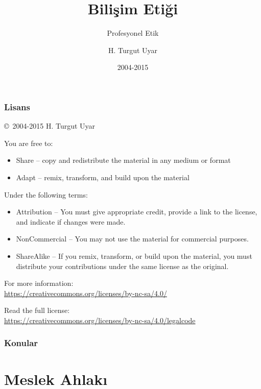 \documentclass[dvipsnames]{beamer}
\title{Bilişim Etiği}
\subtitle{Profesyonel Etik}
\author{H. Turgut Uyar}
\date{2004-2015}
\theoremstyle{plain}
\begin{document}
\begin{frame}
  \titlepage
\end{frame}

\begin{frame}
  \frametitle{Lisans}

  \hfill
  \copyright~2004-2015 H. Turgut Uyar

  \vfill
  \begin{footnotesize}
    You are free to:
    \begin{itemize}
      \itemsep0em
      \item Share -- copy and redistribute the material in any medium or format
      \item Adapt -- remix, transform, and build upon the material
    \end{itemize}

    Under the following terms:
    \begin{itemize}
      \itemsep0em
      \item Attribution -- You must give appropriate credit, provide a link to
        the license, and indicate if changes were made.

      \item NonCommercial -- You may not use the material for commercial
        purposes.

      \item ShareAlike -- If you remix, transform, or build upon the material,
        you must distribute your contributions under the same license as the
        original.
    \end{itemize}
  \end{footnotesize}

  \begin{small}
    For more information:\\
    \url{https://creativecommons.org/licenses/by-nc-sa/4.0/}

    \smallskip
    Read the full license:\\
    \url{https://creativecommons.org/licenses/by-nc-sa/4.0/legalcode}
  \end{small}
\end{frame}

\begin{frame}
  \frametitle{Konular}
  \tableofcontents
\end{frame}

\section{Meslek Ahlakı}
\end{document}
